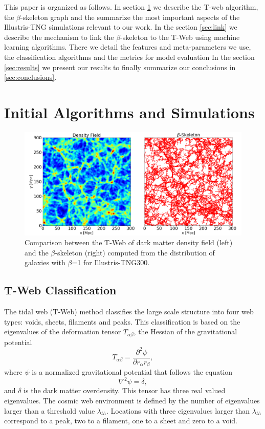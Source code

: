 \documentclass[usenatbib]{mnras}
\begin{document}
This paper is organized as follows. 
In section \ref{sec:init} we describe the T-web algorithm,
the $\beta$-skeleton graph and the summarize the most important
aspects of the Illustris-TNG simulations relevant to our work.
In the section \ref{sec:link} we
describe the mechanism to link the $\beta$-skeleton to the T-Web
using machine learning algorithms. 
There we detail the features and meta-parameters we use, the
classification algorithms and the metrics for model evaluation 
In the section \ref{sec:results} we present our results
to finally summarize our conclusions in \ref{sec:conclusions}.


\section{Initial Algorithms and Simulations}\label{sec:init}

\begin{figure}
\centering
 \includegraphics[scale=0.3]{Figs/Fig1_.png}
 \caption{Comparison between the T-Web of dark matter density field (left) and the $\beta$-skeleton (right) computed from the distribution of galaxies with $\beta$=1 for Illustris-TNG300.}
 \label{fig:Fig1}
\end{figure}



\subsection{T-Web Classification}

The tidal web (T-Web) method \citep{Hahn2007,Forero-Romero2009} classifies the large scale
structure into four web types: voids, sheets, filaments and peaks. 
This classification is based on the eigenvalues of the deformation tensor $T_{\alpha\beta}$, the Hessian of the gravitational potential
\begin{equation}
T_{\alpha\beta}=\frac{\partial^2\psi}{\partial r_{\alpha}r_{\beta}},
\end{equation}
%
where $\psi$ is a normalized gravitational potential that follows the equation
\begin{equation}
    \nabla^2 \psi = \delta,
\end{equation}
%
and $\delta$ is the dark matter overdensity.
This tensor has three real valued eigenvalues. 
The cosmic web environment is defined by the number of eigenvalues larger than
a threshold value $\lambda_{th}$.
Locations with three eigenvalues larger than $\lambda_{th}$ correspond to a peak, two to a filament, one to a sheet and zero to a void.
\end{document}
